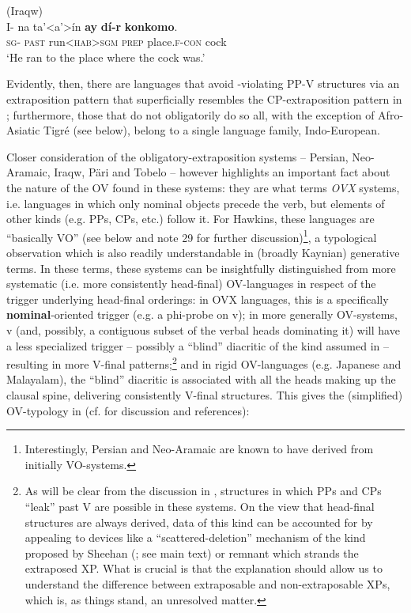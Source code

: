 \documentclass[output=paper]{LSP/langsci}
\begin{document}
 \ex  (Iraqw)\\
\gll I-      na     ta'<a'>ín         \textbf{ay} \textbf{dí-r} \textbf{konkomo}.    \\
    \textsc{sg}- \textsc{past} run<\textsc{hab>sgm}   \textsc{prep} place.\textsc{f-con} cock\\

  \glt ‘He ran to the place where the cock was.’   \citep[100]{Mous1993}
\z
\z

Evidently, then, there are languages that avoid -violating PP-V structures via an extraposition pattern that superficially resembles the CP-extraposition pattern in ; furthermore, those that do not obligatorily do so all, with the exception of Afro-Asiatic Tigré (see below), belong to a single language family, Indo-European.

Closer consideration of the obligatory-extraposition systems – Persian, Neo-Aramaic, Iraqw, Päri and Tobelo – however highlights an important fact about the nature of the OV found in these systems: they are what \citet{Hawkins2008} terms \textit{OVX} systems, i.e. languages in which only nominal objects precede the verb, but elements of other kinds (e.g. PPs, CPs, etc.) follow it. For Hawkins, these languages are “basically VO” (see below and note 29 for further discussion)\footnote{Interestingly, Persian and Neo-Aramaic are known to have derived from initially VO-systems.}, a typological observation which is also readily understandable in (broadly Kaynian) generative terms. In these terms, these systems can be insightfully distinguished from more systematic (i.e. more consistently head-final) OV-languages in respect of the trigger underlying head-final orderings: in OVX languages, this is a specifically \textbf{nominal}{}-oriented trigger (e.g. a phi-probe on v); in more generally OV-systems, v (and, possibly, a contiguous subset of the verbal heads dominating it) will have a less specialized trigger – possibly a “blind” diacritic of the kind assumed in \citet{BiberauerEtAl2014syntactic} – resulting in more V-final patterns;\footnote{As will be clear from the discussion in , structures in which PPs and CPs “leak” past V are possible in these systems. On the view that head-final structures are always derived, data of this kind can be accounted for by appealing to devices like a “scattered-deletion” mechanism of the kind proposed by Sheehan (\citeyear{Sheehan2013fofc}; see main text) or remnant  which strands the extraposed XP. What is crucial is that the explanation should allow us to understand the difference between extraposable and non-extraposable XPs, which is, as things stand, an unresolved matter.} and in rigid OV-languages (e.g. Japanese and Malayalam), the “blind” diacritic is associated with all the heads making up the clausal spine, delivering consistently V-final structures. This gives the (simplified) OV-typology in  (cf. \citealt{BiberauerSheehan2013} for discussion and references):
\end{document}
